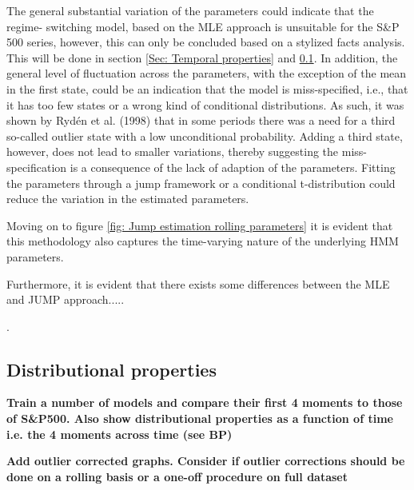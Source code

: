 The general substantial variation of the parameters could indicate that the regime-
switching model, based on the MLE approach is unsuitable for the S\&P 500 series, however, this can only be concluded based on a stylized facts analysis. This will be done in section \ref{Sec: Temporal properties} and \ref{Sec: Distributional properties}. In addition, the general level of fluctuation across the parameters, with the exception of the mean in the first state, could be an indication that the model is miss-specified, i.e., that it has too few states or a wrong kind of conditional distributions. As such, it was shown by Rydén et al. (1998) that in some periods there was a need for a third so-called outlier state with a low unconditional probability. Adding a third state, however, does not lead to smaller variations, thereby suggesting the miss-specification is a consequence of the lack of adaption of the parameters. Fitting the parameters through a jump framework or a conditional t-distribution could reduce the variation in the estimated parameters.

Moving on to figure \ref{fig: Jump estimation rolling parameters} it is evident that this methodology also captures the time-varying nature of the underlying HMM parameters. 

Furthermore, it is evident that there exists some differences between the MLE and JUMP approach.....


. 




\subsection{Distributional properties}
\label{Sec: Distributional properties}

\textbf{Train a number of models and compare their first 4 moments to those of S\&P500. Also show distributional properties as a function of time i.e. the 4 moments across time (see BP)}

\textbf{Add outlier corrected graphs. Consider if outlier corrections should be done on a rolling basis or a one-off procedure on full dataset}

